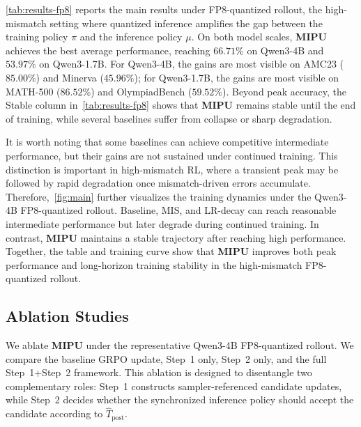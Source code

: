 \autoref{tab:results-fp8} reports the main results under FP8-quantized rollout, the high-mismatch setting where quantized inference amplifies the gap between the training policy $\pi$ and the inference policy $\mu$.
On both model scales, \textbf{MIPU} achieves the best average performance, reaching \textbf{$66.71\%$} on Qwen3-4B and \textbf{$53.97\%$} on Qwen3-1.7B.
For Qwen3-4B, the gains are most visible on AMC23 ($85.00\%$) and Minerva ($45.96\%$); for Qwen3-1.7B, the gains are most visible on MATH-500 ($86.52\%$) and OlympiadBench ($59.52\%$).
Beyond peak accuracy, the Stable column in~\autoref{tab:results-fp8} shows that \textbf{MIPU} remains stable until the end of training, while several baselines suffer from collapse or sharp degradation.

It is worth noting that some baselines can achieve competitive intermediate performance, but their gains are not sustained under continued training.
This distinction is important in high-mismatch RL, where a transient peak may be followed by rapid degradation once mismatch-driven errors accumulate.
Therefore,~\autoref{fig:main} further visualizes the training dynamics under the Qwen3-4B FP8-quantized rollout.
Baseline, MIS, and LR-decay can reach reasonable intermediate performance but later degrade during continued training.
In contrast, \textbf{MIPU} maintains a stable trajectory after reaching high performance.
Together, the table and training curve show that \textbf{MIPU} improves both peak performance and long-horizon training stability in the high-mismatch FP8-quantized rollout.


\subsection{Ablation Studies}
\label{subsec:ablation}

We ablate \textbf{MIPU} under the representative Qwen3-4B FP8-quantized rollout. We compare the baseline GRPO update, Step~1 only, Step~2 only, and the full Step~1+Step~2 framework. This ablation is designed to disentangle two complementary roles: Step~1 constructs sampler-referenced candidate updates, while Step~2 decides whether the synchronized inference policy should accept the candidate according to $\widehat{T}_{\mathrm{post}}$.

